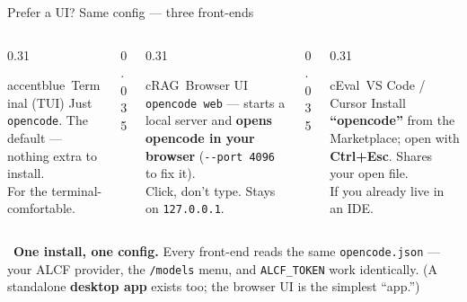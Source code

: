 \begin{frame}{Prefer a UI? Same config --- three front-ends}
  \begin{columns}[t, totalwidth=\textwidth]
    \begin{column}{0.31\textwidth}
      \begin{featbox}{accentblue}{\faTerminal\ Terminal (TUI)}
        \scriptsize Just \texttt{opencode}. The default --- nothing extra to install.
        \\[3pt]{\color{midgray}For the terminal-comfortable.}
      \end{featbox}
    \end{column}
    \begin{column}{0.035\textwidth}\end{column}
    \begin{column}{0.31\textwidth}
      \begin{featbox}{cRAG}{\faWindowMaximize\ Browser UI}
        \scriptsize \texttt{opencode web} --- starts a local server and \textbf{opens
        opencode in your browser} (\texttt{-{}-port 4096} to fix it).
        \\[3pt]{\color{midgray}Click, don't type. Stays on \texttt{127.0.0.1}.}
      \end{featbox}
    \end{column}
    \begin{column}{0.035\textwidth}\end{column}
    \begin{column}{0.31\textwidth}
      \begin{featbox}{cEval}{\faCode\ VS Code / Cursor}
        \scriptsize Install \textbf{``opencode''} from the Marketplace; open with
        \textbf{Ctrl+Esc}. Shares your open file.
        \\[3pt]{\color{midgray}If you already live in an IDE.}
      \end{featbox}
    \end{column}
  \end{columns}
  \vspace{10pt}
  \begin{calloutbox}[cAgent]
    \small\faInfoCircle\ \textbf{One install, one config.} Every front-end reads the same
    \texttt{opencode.json} --- your ALCF provider, the \texttt{/models} menu, and
    \texttt{ALCF\_TOKEN} work identically. (A standalone \textbf{desktop app} exists too;
    the browser UI is the simplest ``app.'')
  \end{calloutbox}
\end{frame}

